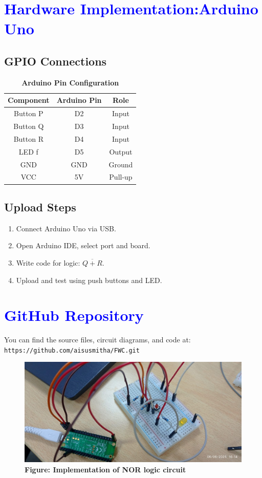 \documentclass[twocolumn]{article}
\begin{document}
\section*{\textcolor{blue}{Hardware Implementation:Arduino Uno}}

\subsection*{GPIO Connections}

\begin{table}[h]
\centering
\renewcommand{\arraystretch}{1.2}
\begin{tabular}{|c|c|c|}
\hline
Component & Arduino Pin & Role \\
\hline
Button P & D2 & Input \\
Button Q & D3 & Input \\
Button R & D4 & Input \\
LED f    & D5 & Output \\
GND      & GND & Ground \\
VCC      & 5V & Pull-up \\
\hline
\end{tabular}
\caption*{\textbf{Arduino Pin Configuration}}
\end{table}

\subsection*{Upload Steps}
\begin{enumerate}
    \item Connect Arduino Uno via USB.
    \item Open Arduino IDE, select port and board.
    \item Write code for logic: $\overline{Q + R}$.
    \item Upload and test using push buttons and LED.
\end{enumerate}

\section*{\textcolor{blue}{GitHub Repository}}
You can find the source files, circuit diagrams, and code at: \\
\texttt{https://github.com/aisusmitha/FWC.git}
\begin{figure}[h]
    \centering
    \includegraphics[width=0.95\linewidth]{platformio.jpg}
        \caption*{\textbf{Figure: Implementation of NOR logic circuit}}
\end{figure}
\end{document}
